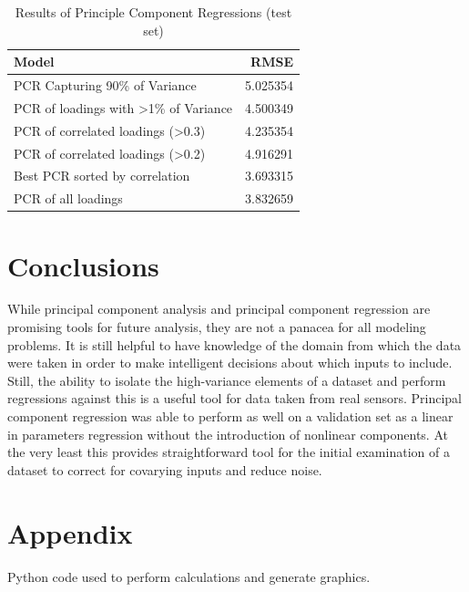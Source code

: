 \documentclass{IEEEtran}
\begin{document}
\begin{centering}
\begin{table}
\caption{Results of Principle Component Regressions (test set)\label{tab:results}}
\begin{tabular}{lr}
\toprule
                                Model &      RMSE \\
\midrule
        PCR Capturing 90\% of Variance &  5.025354 \\
 PCR of loadings with \textgreater1\% of Variance &  4.500349 \\
    PCR of correlated loadings (\textgreater0.3) &  4.235354 \\
    PCR of correlated loadings (\textgreater0.2) &  4.916291 \\
       Best PCR sorted by correlation &  3.693315 \\
                  PCR of all loadings &  3.832659 \\
\bottomrule
\end{tabular}\end{table}
\end{centering}

\section{Conclusions}

While principal component analysis and principal component regression are promising tools for future analysis, they are not a panacea for all modeling problems. It is still helpful to have knowledge of the domain from which the data were taken in order to make intelligent decisions about which inputs to include. Still, the ability to isolate the high-variance elements of a dataset and perform regressions against this is a useful tool for data taken from real sensors. Principal component regression was able to perform as well on a validation set as a linear in parameters regression without the introduction of nonlinear components. At the very least this provides straightforward tool for the initial examination of a dataset to correct for covarying inputs and reduce noise.

\printbibliography

\onecolumn
\section{Appendix}
Python code used to perform calculations and generate graphics.
\lstset{frame=single}

\end{document}
